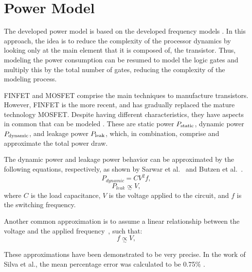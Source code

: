 \section{Power Model} \label{sec:power_model}

The developed power model is based on the developed frequency models \cite{Rauber2014EnergyScaling, Goel2016AProcessors, Du2017ModelingSystems, Gonzalez1997SupplyCMOS}. In this approach, the idea is to reduce the complexity of the processor dynamics by looking only at the main element that it is composed of, the transistor. Thus, modeling the power consumption can be resumed to model the logic gates and multiply this by the total number of gates, reducing the complexity of the modeling process.

FINFET and MOSFET comprise the main techniques to manufacture transistors. However, FINFET is the more recent,  and has gradually replaced the mature technology MOSFET. Despite having different characteristics, they have aspects in common that can be modeled  \cite{Rauber2014EnergyScaling, Goel2016AProcessors, Du2017ModelingSystems, Gonzalez1997SupplyCMOS}. These are static power $P_{\rm static}$, dynamic power $P_{\rm dynamic}$, and leakage power $P_{\rm leak}$, which, in combination, comprise  and approximate the total power draw.

The dynamic power and leakage power behavior can be approximated by the following equations, respectively, as shown by Sarwar et al.~\cite{Sarwar1997CmosCalculation} and Butzen et al.~\cite{Butzen2007LeakageGates}.
\begin{equation}
	P_{dynamic}=CV^2f,
	\label{eq:power_dyn}
\end{equation}
\begin{equation}
	P_{leak} \underset{\sim}{\propto} V,
	\label{eq:power_leak}
\end{equation}
where $C$ is the load capacitance, $V$ is the voltage applied to the circuit, and $f$ is the switching frequency.

Another common approximation is to assume a linear relationship between the voltage and the applied frequency~\cite{Usman2013ANoC}, such that:
\begin{equation}
	f \underset{\sim}{\propto} V,
	\label{eq:f_v}
\end{equation}

These approximations have been demonstrated to be very precise. In the work of Silva et al., the mean percentage error was calculated to be 0.75\% \cite{Silva2019Energy-OptimalApplications}.

